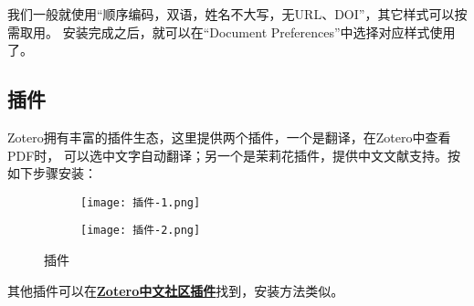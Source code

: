 我们一般就使用“顺序编码，双语，姓名不大写，无URL、DOI”，其它样式可以按需取用。
安装完成之后，就可以在“Document Preferences”中选择对应样式使用了。

\subsection{插件}
Zotero拥有丰富的插件生态，这里提供两个插件，一个是翻译，在Zotero中查看PDF时，
可以选中文字自动翻译；另一个是茉莉花插件，提供中文文献支持。按如下步骤安装：
\begin{figure}[h]
  \centering
  \begin{subfigure}[c]{0.48\textwidth}
    \texttt{[image: 插件-1.png]}
   \label{Zotero 11-1}
  \end{subfigure}
  \hfill
  \begin{subfigure}[c]{0.48\textwidth}
    \texttt{[image: 插件-2.png]}
    \label{Zotero 11-2}
  \end{subfigure}
  \caption{插件}
  \label{Zotero 11}
\end{figure}

其他插件可以在\textbf{\textcolor{blue}{\href{https://zotero-chinese.com/plugins/}{Zotero中文社区插件}}}找到，安装方法类似。
